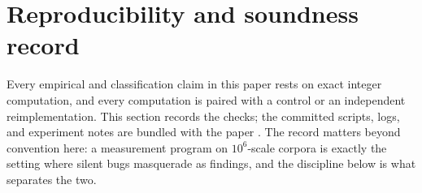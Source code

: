 
\section{Reproducibility and soundness record}\label{sec:sound}

Every empirical and classification claim in this paper rests on exact
integer computation, and every computation is paired with a control or an
independent reimplementation. This section records the checks; the
committed scripts, logs, and experiment notes are bundled with the paper
\cite{prog-artifacts}. The record matters beyond convention here: a
measurement program on $10^6$-scale corpora is exactly the setting where
silent bugs masquerade as findings, and the discipline below is what
separates the two.

